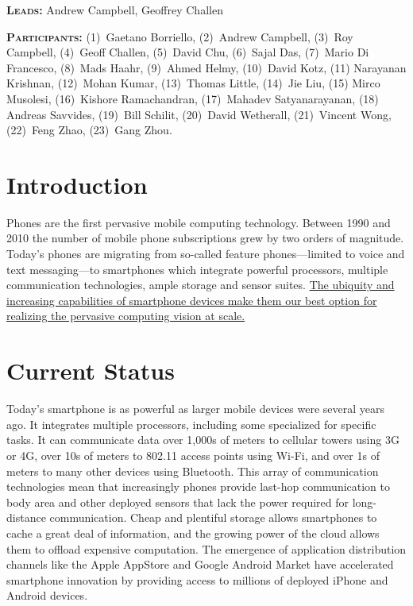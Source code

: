 \textbf{\scshape Leads:} Andrew Campbell, Geoffrey Challen

\textbf{\scshape Participants:} (1)~Gaetano Borriello, (2)~Andrew Campbell,
(3)~Roy Campbell, (4)~Geoff Challen, (5)~David Chu, (6)~Sajal Das, (7)~Mario
Di Francesco, (8)~Mads Haahr, (9)~Ahmed Helmy, (10)~David Kotz, (11)
Narayanan Krishnan, (12)~Mohan Kumar, (13)~Thomas Little, (14)~Jie Liu, (15)
Mirco Musolesi, (16)~Kishore Ramachandran, (17)~Mahadev Satyanarayanan, (18)
Andreas Savvides, (19)~Bill Schilit, (20)~David Wetherall, (21)~Vincent Wong,
(22)~Feng Zhao, (23)~Gang Zhou.

\section{Introduction}

Phones are the first pervasive mobile computing technology. Between 1990 and
2010 the number of mobile phone subscriptions grew by two orders of
magnitude. Today’s phones are migrating from so-called feature
phones---limited to voice and text messaging---to smartphones which integrate
powerful processors, multiple communication technologies, ample storage and
sensor suites. \uline{The ubiquity and increasing capabilities of smartphone
devices make them our best option for realizing the pervasive computing
vision at scale.}

\section{Current Status}

Today’s smartphone is as powerful as larger mobile devices were several years
ago. It integrates multiple processors, including some specialized for
specific tasks. It can communicate data over 1,000s of meters to cellular
towers using 3G or 4G, over 10s of meters to 802.11 access points using
Wi-Fi, and over 1s of meters to many other devices using Bluetooth. This
array of communication technologies mean that increasingly phones provide
last-hop communication to body area and other deployed sensors that lack the
power required for long-distance communication. Cheap and plentiful storage
allows smartphones to cache a great deal of information, and the growing
power of the cloud allows them to offload expensive computation. The
emergence of application distribution channels like the Apple AppStore and
Google Android Market have accelerated smartphone innovation by providing
access to millions of deployed iPhone and Android devices.

